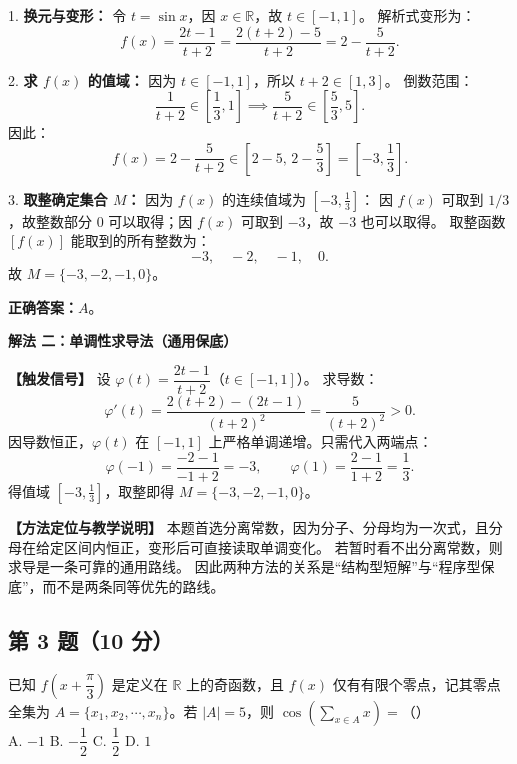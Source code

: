 \documentclass[11pt,a4paper,fontset=fandol]{ctexart}
\newcommand{\method}[1]{\par\medskip\noindent\textbf{解法 #1}\par}
\begin{document}
1. \textbf{换元与变形：}
令 $t = \sin x$，因 $x \in \mathbb{R}$，故 $t \in [-1, 1]$。
解析式变形为：
\[
f(x) = \frac{2t - 1}{t + 2} = \frac{2(t + 2) - 5}{t + 2} = 2 - \frac{5}{t + 2}.
\]

2. \textbf{求 $f(x)$ 的值域：}
因为 $t \in [-1, 1]$，所以 $t + 2 \in [1, 3]$。
倒数范围：
\[
\frac{1}{t + 2} \in \left[\frac{1}{3}, 1\right] \implies \frac{5}{t + 2} \in \left[\frac{5}{3}, 5\right].
\]
因此：
\[
f(x) = 2 - \frac{5}{t + 2} \in \left[2 - 5, \, 2 - \frac{5}{3}\right] = \left[-3, \frac{1}{3}\right].
\]

3. \textbf{取整确定集合 $M$：}
因为 $f(x)$ 的连续值域为 $\left[-3, \frac{1}{3}\right]$：
因 $f(x)$ 可取到 $1/3$，故整数部分 $0$ 可以取得；因 $f(x)$ 可取到 $-3$，故 $-3$ 也可以取得。
取整函数 $[f(x)]$ 能取到的所有整数为：
\[
-3, \quad -2, \quad -1, \quad 0.
\]
故 $M = \{-3, -2, -1, 0\}$。

\begin{answerbox}
\textbf{正确答案：}\(\boxed{A}\)。
\end{answerbox}

\method{二：单调性求导法（通用保底）}

\noindent\textbf{【触发信号】}
设 $\varphi(t) = \dfrac{2t - 1}{t + 2}$（$t \in [-1, 1]$）。
求导数：
\[
\varphi'(t) = \frac{2(t+2) - (2t-1)}{(t+2)^2} = \frac{5}{(t+2)^2} > 0.
\]
因导数恒正，$\varphi(t)$ 在 $[-1, 1]$ 上严格单调递增。只需代入两端点：
\[
\varphi(-1) = \frac{-2 - 1}{-1 + 2} = -3, \qquad \varphi(1) = \frac{2 - 1}{1 + 2} = \frac{1}{3}.
\]
得值域 $\left[-3, \frac{1}{3}\right]$，取整即得 $M = \{-3, -2, -1, 0\}$。

\begin{note}
\textbf{【方法定位与教学说明】} 
本题首选分离常数，因为分子、分母均为一次式，且分母在给定区间内恒正，变形后可直接读取单调变化。
若暂时看不出分离常数，则求导是一条可靠的通用路线。
因此两种方法的关系是“结构型短解”与“程序型保底”，而不是两条同等优先的路线。
\end{note}

\newpage
\subsection*{第 3 题（10 分）}

\begin{problembox}
已知 \(f\left(x+\dfrac{\pi}{3}\right)\) 是定义在 \(\mathbb{R}\) 上的奇函数，且 \(f(x)\) 仅有有限个零点，记其零点全集为 \(A = \{x_1, x_2, \cdots, x_n\}\)。若 \(|A| = 5\)，则 \(\cos\left(\sum_{x \in A} x\right) =\)（\qquad）\\[0.4em]
A. \(-1\) \qquad\qquad\qquad B. \(-\dfrac{1}{2}\) \qquad\qquad\qquad C. \(\dfrac{1}{2}\) \qquad\qquad\qquad D. \(1\)
\end{problembox}
\end{document}
